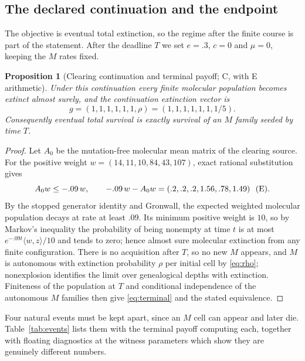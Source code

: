\documentclass[11pt]{article}
\newtheorem{proposition}[theorem]{Proposition}
\theoremstyle{remark}
\begin{document}
\subsection{The declared continuation and the endpoint}
The objective is eventual total extinction, so the regime after the finite course
is part of the statement. After the deadline $T$ we set $e=.3$, $c=0$ and
$\mu=0$, keeping the $M$ rates fixed.

\begin{proposition}[Clearing continuation and terminal payoff; C, with E arithmetic]
\label{prop:endpoint}
Under this continuation every finite molecular population becomes extinct almost
surely, and the continuation extinction vector is
\begin{equation}
 g=(1,1,1,1,1,1,\rho)=(1,1,1,1,1,1,1/5).\label{eq:terminal}
\end{equation}
Consequently eventual total survival is exactly survival of an $M$ family seeded
by time $T$.
\end{proposition}

\begin{proof}
Let $A_0$ be the mutation-free molecular mean matrix of the clearing source. For
the positive weight $w=(14,11,10,84,43,107)$, exact rational substitution gives
\begin{equation}
 A_0w\le-.09\,w,\qquad -.09\,w-A_0w=(.2,.2,.2,1.56,.78,1.49)\ \ \text{\textup{(E)}}.
 \label{eq:weight}
\end{equation}
By the stopped generator identity and Gronwall, the expected weighted molecular
population decays at rate at least $.09$. Its minimum positive weight is $10$, so
by Markov's inequality the probability of being nonempty at time $t$ is at most
$e^{-.09t}\langle w,z\rangle/10$ and tends to zero; hence almost sure molecular
extinction from any finite configuration. There is no acquisition after $T$, so
no new $M$ appears, and $M$ is autonomous with extinction probability $\rho$ per
initial cell by \eqref{eq:rho}; nonexplosion identifies the limit over
genealogical depths with extinction. Finiteness of the population at $T$ and
conditional independence of the autonomous $M$ families then give
\eqref{eq:terminal} and the stated equivalence.
\end{proof}

Four natural events must be kept apart, since an $M$ cell can appear and later
die. Table~\ref{tab:events} lists them with the terminal payoff computing each,
together with floating diagnostics at the witness parameters which show they are
genuinely different numbers.
\end{document}
